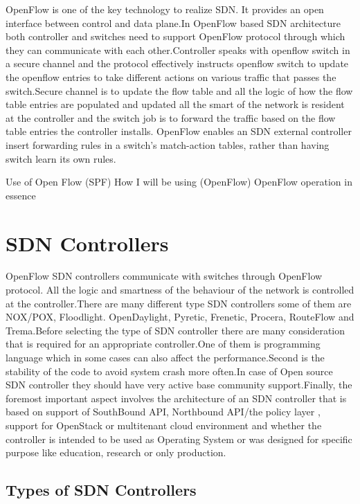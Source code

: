 OpenFlow is one of the key technology to realize SDN. It provides an open interface between control and data plane.In OpenFlow based SDN architecture both controller and switches need to support OpenFlow protocol through which they can communicate with each other.Controller speaks with openflow switch in a secure channel and the protocol effectively instructs openflow switch to update the openflow entries to take different actions on various traffic that passes the switch.Secure channel is to update the flow table and all the logic of how the flow table entries are populated and updated all the smart of the network is resident at the controller and the switch job is to forward the traffic based on the flow table entries the controller installs. OpenFlow enables an SDN external controller insert forwarding rules in a switch's match-action tables, rather than having switch learn its own rules. 

Use of Open Flow (SPF)
How I will be using (OpenFlow)
OpenFlow operation in essence

\section{SDN  Controllers}
\label{ch:Analyse:sec:Abschnitt2}

OpenFlow SDN controllers communicate with switches through OpenFlow protocol. All the logic and smartness of the behaviour of the network is controlled at the controller.There are many different type SDN controllers some of them are NOX/POX, Floodlight. OpenDaylight, Pyretic, Frenetic, Procera, RouteFlow and Trema.Before selecting the type of SDN controller there are many consideration that is required for an appropriate controller.One of them is programming language which in some cases can also affect the performance\cite{Hp}.Second is the stability of the code to avoid system crash more often.In case of Open source SDN controller they should have very active base community support.Finally, the foremost important aspect involves the architecture of an SDN controller that is based on support of SouthBound API, Northbound API/the policy layer , support for OpenStack or multitenant cloud environment and whether the controller is intended to be used as Operating System or was designed for specific purpose like education, research or only production.

\subsection { Types of SDN Controllers}

